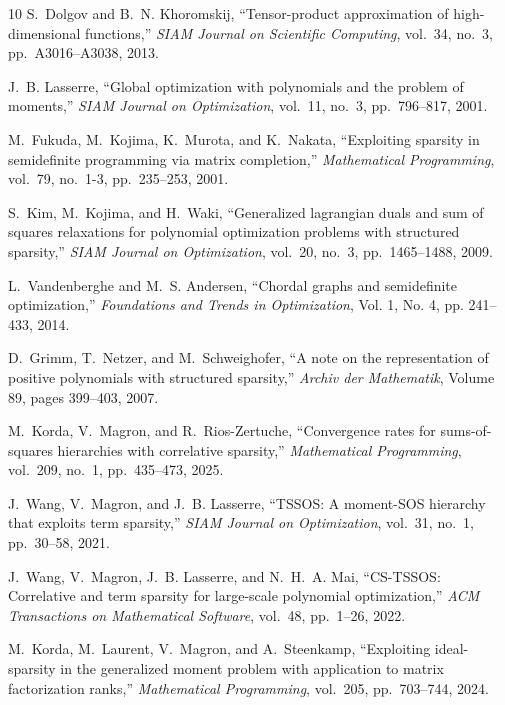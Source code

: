 \documentclass[11pt,a4paper]{article}
\theoremstyle{definition}
\begin{document}
\begin{thebibliography}{10}
S.~Dolgov and B.~N. Khoromskij, ``Tensor-product approximation of
  high-dimensional functions,'' {\em SIAM Journal on Scientific Computing},
  vol.~34, no.~3, pp.~A3016--A3038, 2013.

J.~B. Lasserre, ``Global optimization with polynomials and the problem of
  moments,'' {\em SIAM Journal on Optimization}, vol.~11, no.~3, pp.~796--817,
  2001.

M.~Fukuda, M.~Kojima, K.~Murota, and K.~Nakata, ``Exploiting sparsity in
  semidefinite programming via matrix completion,'' {\em Mathematical
  Programming}, vol.~79, no.~1-3, pp.~235--253, 2001.

S.~Kim, M.~Kojima, and H.~Waki, ``Generalized lagrangian duals and sum of
  squares relaxations for polynomial optimization problems with structured
  sparsity,'' {\em SIAM Journal on Optimization}, vol.~20, no.~3,
  pp.~1465--1488, 2009.

L.~Vandenberghe and M.~S. Andersen, ``Chordal graphs and semidefinite
  optimization,'' {\em Foundations and Trends in Optimization}, Vol. 1, No. 4, pp. 241–433, 2014.

D.~Grimm, T.~Netzer, and M.~Schweighofer, ``A note on the representation of
  positive polynomials with structured sparsity,'' {\em Archiv der Mathematik}, Volume 89, pages 399–403,  
  2007.

M.~Korda, V.~Magron, and R.~Rios-Zertuche, ``Convergence rates for
  sums-of-squares hierarchies with correlative sparsity,'' {\em Mathematical
  Programming}, vol.~209, no.~1, pp.~435--473, 2025.
  
J.~Wang, V.~Magron, and J.~B. Lasserre, ``{{TSSOS}}: A moment-{{SOS}} hierarchy
  that exploits term sparsity,'' {\em SIAM Journal on Optimization}, vol.~31,
  no.~1, pp.~30--58, 2021.

J.~Wang, V.~Magron, J.~B. Lasserre, and N.~H.~A. Mai, ``{{CS-TSSOS}}:
  Correlative and term sparsity for large-scale polynomial optimization,'' {\em
  ACM Transactions on Mathematical Software}, vol.~48, pp.~1--26, 2022.

M.~Korda, M.~Laurent, V.~Magron, and A.~Steenkamp, ``Exploiting ideal-sparsity
  in the generalized moment problem with application to matrix factorization
  ranks,'' {\em Mathematical Programming}, vol.~205, pp.~703--744, 2024.


\end{thebibliography}
\end{document}
